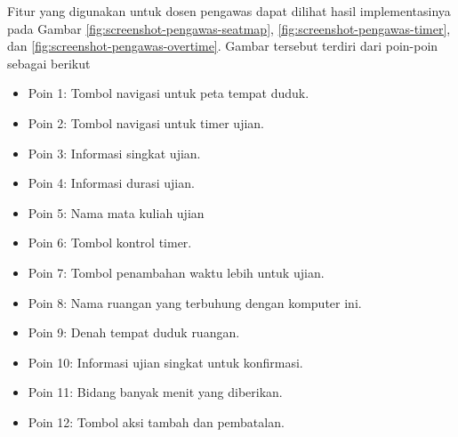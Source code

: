     Fitur yang digunakan untuk dosen pengawas dapat dilihat hasil implementasinya pada
    Gambar \ref{fig:screenshot-pengawas-seatmap}, \ref{fig:screenshot-pengawas-timer}, dan
    \ref{fig:screenshot-pengawas-overtime}. Gambar tersebut terdiri dari poin-poin sebagai berikut
    \begin{itemize}
        \item Poin 1: Tombol navigasi untuk peta tempat duduk.
        \item Poin 2: Tombol navigasi untuk timer ujian.
        \item Poin 3: Informasi singkat ujian.
        \item Poin 4: Informasi durasi ujian.
        \item Poin 5: Nama mata kuliah ujian
        \item Poin 6: Tombol kontrol timer.
        \item Poin 7: Tombol penambahan waktu lebih untuk ujian.
        \item Poin 8: Nama ruangan yang terbuhung dengan komputer ini.
        \item Poin 9: Denah tempat duduk ruangan.
        \item Poin 10: Informasi ujian singkat untuk konfirmasi.
        \item Poin 11: Bidang banyak menit yang diberikan.
        \item Poin 12: Tombol aksi tambah dan pembatalan.
    \end{itemize}
    
    
    

